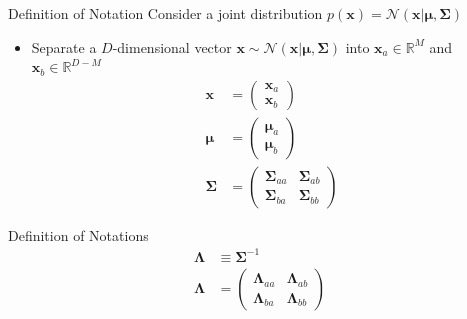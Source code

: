 \documentclass[10pt]{beamer}
\begin{document}
    \begin{frame}{Definition of Notation}
        Consider a joint distribution $p(\mathbf x) = \mathcal N(\mathbf x | \bm \mu, \bm \Sigma)$
        \begin{itemize}
            \item Separate a $D$-dimensional vector $\mathbf x \sim \mathcal N(\mathbf x | \bm \mu, \bm \Sigma)$
                into $\mathbf x_a \in \mathbb R^M$ and $\mathbf x_b \in \mathbb R^{D-M}$
                \begin{align*}
                    \mathbf x &= \begin{pmatrix}
                        \mathbf x_a \\
                        \mathbf x_b 
                    \end{pmatrix} \tag{2.65}\\
                    \bm \mu &= \begin{pmatrix}
                        \bm \mu_a \\
                        \bm \mu_b 
                    \end{pmatrix} \tag{2.66}\\
                    \bm \Sigma &= \begin{pmatrix}
                        \bm \Sigma_{aa} & \bm \Sigma_{ab} \\
                        \bm \Sigma_{ba} & \bm \Sigma_{bb} 
                    \end{pmatrix} \tag{2.67}
                \end{align*}
        \end{itemize}
    \end{frame}

    \begin{frame}{Definition of Notations}
        \begin{align*}
            \bm\Lambda &\equiv \bm\Sigma^{-1} \tag{2.68} \\
            \bm\Lambda &= \begin{pmatrix}
                \bm \Lambda_{aa} & \bm \Lambda_{ab} \\
                \bm \Lambda_{ba} & \bm \Lambda_{bb} 
            \end{pmatrix} \tag{2.69}
        \end{align*}
    \end{frame}
    
\end{document}
